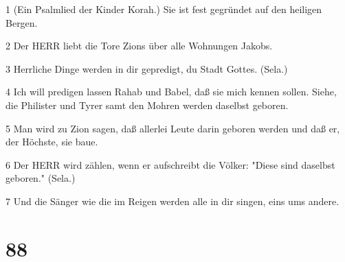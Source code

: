 \par 1 (Ein Psalmlied der Kinder Korah.) Sie ist fest gegründet auf den heiligen Bergen.
\par 2 Der HERR liebt die Tore Zions über alle Wohnungen Jakobs.
\par 3 Herrliche Dinge werden in dir gepredigt, du Stadt Gottes. (Sela.)
\par 4 Ich will predigen lassen Rahab und Babel, daß sie mich kennen sollen. Siehe, die Philister und Tyrer samt den Mohren werden daselbst geboren.
\par 5 Man wird zu Zion sagen, daß allerlei Leute darin geboren werden und daß er, der Höchste, sie baue.
\par 6 Der HERR wird zählen, wenn er aufschreibt die Völker: "Diese sind daselbst geboren." (Sela.)
\par 7 Und die Sänger wie die im Reigen werden alle in dir singen, eins ums andere.

\chapter{88}

